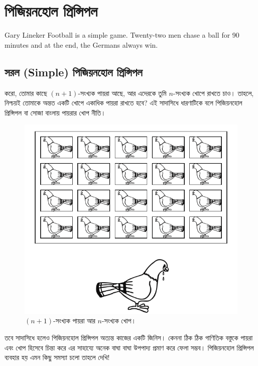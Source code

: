 \newcommand{\phpname}{পিজিয়নহোল প্রিন্সিপল}
\newcommand{\phpnamer}{পিজিয়নহোল প্রিন্সিপলের}
\chapter[পিজিয়নহোল প্রিন্সিপল (Pigeonhole Principle)]{পিজিয়নহোল প্রিন্সিপল}
\begin{chapquote}{Gary Lineker}
	Football is a simple game. Twenty-two men chase a ball for 90 minutes and at the end, the Germans always win.
\end{chapquote}
\vspace{-2em}
\section{সরল (Simple) \phpname{}}
 করো, তোমার কাছে $(n+1)$-সংখ্যক পায়রা আছে, আর এদেরকে তুমি $n$-সংখ্যক খোপে রাখতে চাও। তাহলে, নিশ্চয়ই তোমাকে অন্তত একটি খোপে একাধিক পায়রা রাখতে হবে? এই সাদাসিধে ধারণাটিকে বলে \phpname{} বা সোজা বাংলায় পায়রার খোপ নীতি।
\begin{figure}[hbt]
\centering
\includegraphics[width=0.5\linewidth]{img/pigeonhole_principle/pigeonhole}
\caption{$(n+1)$-সংখ্যক পায়রা আর $n$-সংখ্যক খোপ।}
\end{figure}

তবে সাদাসিধে হলেও \phpname{} অত্যন্ত কাজের একটি জিনিস। কেননা ঠিক ঠিক গাণিতিক বস্তুকে পায়রা এবং খোপ হিসেবে চিন্তা করে এর সাহায্যে অনেক বাঘা বাঘা উপপাদ্য প্রমাণ করে ফেলা সম্ভব। \phpname{} ব্যবহার হয় এমন কিছু সমস্যা চলো তাহলে দেখি!

